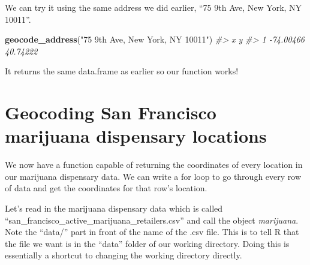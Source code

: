 \documentclass[
  12pt,
]{book}
\newenvironment{Shaded}{\begin{snugshade}}{\end{snugshade}}
\newcommand{\CommentTok}[1]{\textcolor[rgb]{0.37,0.37,0.37}{\textit{#1}}}
\newcommand{\KeywordTok}[1]{\textcolor[rgb]{0.27,0.27,0.27}{\textbf{#1}}}
\newcommand{\NormalTok}[1]{#1}
\newcommand{\StringTok}[1]{\textcolor[rgb]{0.5,0.5,0.5}{#1}}
\begin{document}
We can try it using the same address we did earlier, ``75 9th Ave, New York, NY 10011''.

\begin{Shaded}
\begin{Highlighting}[]
\KeywordTok{geocode\_address}\NormalTok{(}\StringTok{"75 9th Ave, New York, NY 10011"}\NormalTok{)}
\CommentTok{\#\textgreater{}           x        y}
\CommentTok{\#\textgreater{} 1 {-}74.00466 40.74222}
\end{Highlighting}
\end{Shaded}

It returns the same data.frame as earlier so our function works!

\hypertarget{geocoding-san-francisco-marijuana-dispensary-locations}{%
\section{Geocoding San Francisco marijuana dispensary locations}\label{geocoding-san-francisco-marijuana-dispensary-locations}}

We now have a function capable of returning the coordinates of every location in our marijuana dispensary data. We can write a for loop to go through every row of data and get the coordinates for that row's location.

Let's read in the marijuana dispensary data which is called ``san\_francisco\_active\_marijuana\_retailers.csv'' and call the object \emph{marijuana}. Note the ``data/'' part in front of the name of the .csv file. This is to tell R that the file we want is in the ``data'' folder of our working directory. Doing this is essentially a shortcut to changing the working directory directly.
\end{document}
